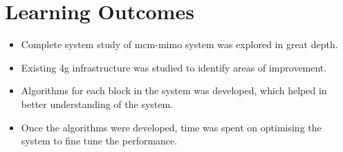 \section{Learning Outcomes}
\begin{itemize}
\item Complete system study of \acrshort{mcm}-\acrshort{mimo} system was explored in great depth.
\item Existing \acrshort{4g} infrastructure was studied to identify areas of improvement.
\item Algorithms for each block in the system was developed, which helped in better understanding of the system.
\item Once the algorithms were developed, time was spent on optimising the system to fine tune the performance.
\end{itemize}




